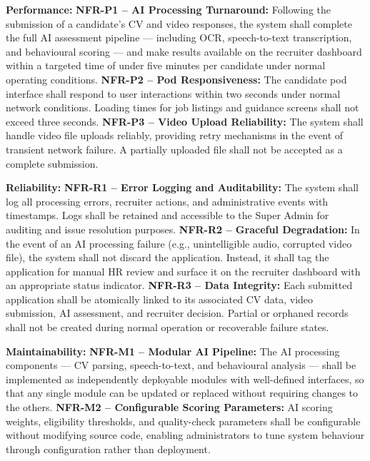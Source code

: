\begin{outline}
  \1 \textbf{Performance:}
  \2 \textbf{NFR-P1 -- AI Processing Turnaround:} Following the submission of a candidate's CV and video responses, the system shall complete the full AI assessment pipeline --- including OCR, speech-to-text transcription, and behavioural scoring --- and make results available on the recruiter dashboard within a targeted time of under five minutes per candidate under normal operating conditions.
  \2 \textbf{NFR-P2 -- Pod Responsiveness:} The candidate pod interface shall respond to user interactions within two seconds under normal network conditions. Loading times for job listings and guidance screens shall not exceed three seconds.
  \2 \textbf{NFR-P3 -- Video Upload Reliability:} The system shall handle video file uploads reliably, providing retry mechanisms in the event of transient network failure. A partially uploaded file shall not be accepted as a complete submission.

  \1 \textbf{Reliability:}
  \2 \textbf{NFR-R1 -- Error Logging and Auditability:} The system shall log all processing errors, recruiter actions, and administrative events with timestamps. Logs shall be retained and accessible to the Super Admin for auditing and issue resolution purposes.
  \2 \textbf{NFR-R2 -- Graceful Degradation:} In the event of an AI processing failure (e.g., unintelligible audio, corrupted video file), the system shall not discard the application. Instead, it shall tag the application for manual HR review and surface it on the recruiter dashboard with an appropriate status indicator.
  \2 \textbf{NFR-R3 -- Data Integrity:} Each submitted application shall be atomically linked to its associated CV data, video submission, AI assessment, and recruiter decision. Partial or orphaned records shall not be created during normal operation or recoverable failure states.

  \1 \textbf{Maintainability:}
  \2 \textbf{NFR-M1 -- Modular AI Pipeline:} The AI processing components --- CV parsing, speech-to-text, and behavioural analysis --- shall be implemented as independently deployable modules with well-defined interfaces, so that any single module can be updated or replaced without requiring changes to the others.
  \2 \textbf{NFR-M2 -- Configurable Scoring Parameters:} AI scoring weights, eligibility thresholds, and quality-check parameters shall be configurable without modifying source code, enabling administrators to tune system behaviour through configuration rather than deployment.


\end{outline}

